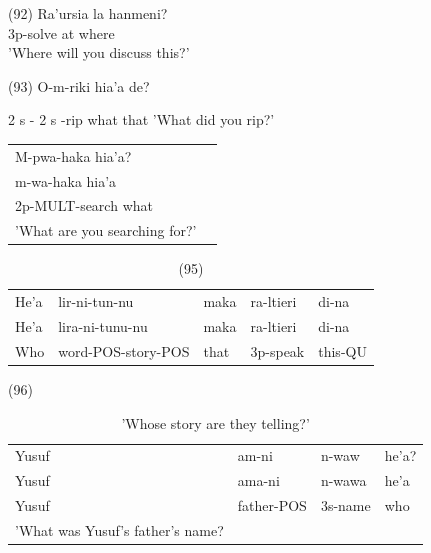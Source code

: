\documentclass[10pt]{article}
\begin{document}
\begin{table}[h]
\begin{center}
\captionsetup{labelformat=empty}
\caption{'Where did you harbor the boat?'}
(92) Ra'ursia la hanmeni?\\
3p-solve at where\\
'Where will you discuss this?'
\end{center}
\end{table}

(93) O-m-riki hia'a de?

2 s - 2 s -rip what that 'What did you rip?'

\begin{center}
\begin{tabular}{ll}
M-pwa-haka hia'a? &  \\
m-wa-haka hia'a &  \\
2p-MULT-search what &  \\
'What are you searching for?' &  \\
\end{tabular}
\end{center}

\begin{table}[h]
\begin{center}
\captionsetup{labelformat=empty}
\caption{(95)}
\begin{tabular}{lllll}
He'a & lir-ni-tun-nu & maka & ra-ltieri & di-na \\
He'a & lira-ni-tunu-nu & maka & ra-ltieri & di-na \\
Who & word-POS-story-POS & that & 3p-speak & this-QU \\
\end{tabular}
\end{center}
\end{table}

(96)

\begin{table}[h]
\begin{center}
\captionsetup{labelformat=empty}
\caption{'Whose story are they telling?'}
\begin{tabular}{llll}
Yusuf & am-ni & n-waw & he'a? \\
Yusuf & ama-ni & n-wawa & he'a \\
Yusuf & father-POS & 3s-name & who \\
'What was Yusuf's father's name? &  &  &  \\
\end{tabular}
\end{center}
\end{table}
\end{document}
